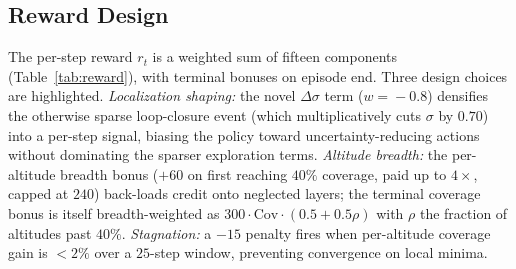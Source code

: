 \documentclass[conference]{IEEEtran}
\begin{document}
\subsection{Reward Design}\label{sec:reward}

The per-step reward $r_t$ is a weighted sum of fifteen components (Table~\ref{tab:reward}), with terminal bonuses on episode end. Three design choices are highlighted. \emph{Localization shaping:} the novel $\Delta\sigma$ term ($w\!=\!-0.8$) densifies the otherwise sparse loop-closure event (which multiplicatively cuts $\sigma$ by $0.70$) into a per-step signal, biasing the policy toward uncertainty-reducing actions without dominating the sparser exploration terms. \emph{Altitude breadth:} the per-altitude breadth bonus ($+60$ on first reaching $40\%$ coverage, paid up to $4{\times}$, capped at $240$) back-loads credit onto neglected layers; the terminal coverage bonus is itself breadth-weighted as $300\!\cdot\!\mathrm{Cov}\!\cdot\!(0.5+0.5\rho)$ with $\rho$ the fraction of altitudes past $40\%$. \emph{Stagnation:} a $-15$ penalty fires when per-altitude coverage gain is $<\!2\%$ over a $25$-step window, preventing convergence on local minima.
\end{document}
